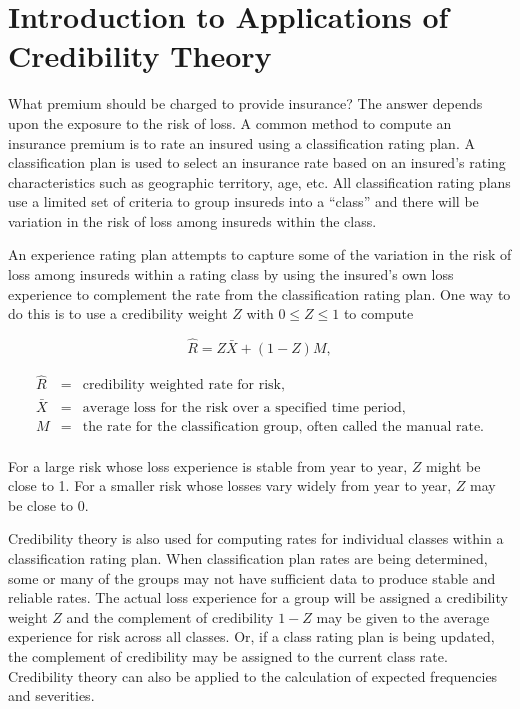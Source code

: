 \documentclass[]{book}
\theoremstyle{definition}
\theoremstyle{definition}
\theoremstyle{definition}
\theoremstyle{remark}
\begin{document}
\section{Introduction to Applications of Credibility
Theory}\label{introduction-to-applications-of-credibility-theory}

What premium should be charged to provide insurance? The answer depends
upon the exposure to the risk of loss. A common method to compute an
insurance premium is to rate an insured using a classification rating
plan. A classification plan is used to select an insurance rate based on
an insured's rating characteristics such as geographic territory, age,
etc. All classification rating plans use a limited set of criteria to
group insureds into a ``class'' and there will be variation in the risk
of loss among insureds within the class.

An experience rating plan attempts to capture some of the variation in
the risk of loss among insureds within a rating class by using the
insured's own loss experience to complement the rate from the
classification rating plan. One way to do this is to use a credibility
weight \(Z\) with \(0\leq Z \leq 1\) to compute

\begin{equation*} 
\hat{R}=Z\bar{X}+(1-Z)M,
\end{equation*}

\begin{eqnarray*}
\hat{R}&=&\textrm{credibility weighted rate for risk,}\\
           \bar{X}&=&\textrm{average loss for the risk over a specified time period,}\\
                  M&=&\textrm{the rate for the classification group, often called the manual rate.}\\
\end{eqnarray*}

For a large risk whose loss experience is stable from year to year,
\(Z\) might be close to 1. For a smaller risk whose losses vary widely
from year to year, \(Z\) may be close to 0.

Credibility theory is also used for computing rates for individual
classes within a classification rating plan. When classification plan
rates are being determined, some or many of the groups may not have
sufficient data to produce stable and reliable rates. The actual loss
experience for a group will be assigned a credibility weight \(Z\) and
the complement of credibility \(1-Z\) may be given to the average
experience for risk across all classes. Or, if a class rating plan is
being updated, the complement of credibility may be assigned to the
current class rate. Credibility theory can also be applied to the
calculation of expected frequencies and severities.
\end{document}
